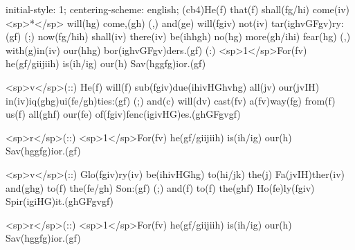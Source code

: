 initial-style: 1;
centering-scheme: english;
(cb4)He(f) that(f) shall(fg/hi) come(iv) <sp>*</sp> will(hg) come,(gh) (,) and(ge) will(fgiv) not(iv) tar(ighvGFgv)ry:(gf) (;) now(fg/hih) shall(iv) there(iv) be(ihhgh) no(hg) more(gh/ihi) fear(hg) (,) with(g)in(iv) our(hhg) bor(ighvGFgv)ders.(gf) (:) <sp>1</sp>For(fv) he(gf/giijiih) is(ih/ig) our(h) Sav(hggfg)ior.(gf) 

<sp>v</sp>(::) He(f) will(f) sub(fgiv)due(ihivHGhvhg) all(jv) our(jvIH) in(iv)iq(ghg)ui(fe/gh)ties:(gf) (;) and(c) will(dv) cast(fv) a(fv)way(fg) from(f) us(f) all(ghf) our(fe) of(fgiv)fenc(igivHG)es.(ghGFgvgf) 

<sp>r</sp>(::) <sp>1</sp>For(fv) he(gf/giijiih) is(ih/ig) our(h) Sav(hggfg)ior.(gf) 

<sp>v</sp>(::) Glo(fgiv)ry(iv) be(ihivHGhg) to(hi/jk) the(j) Fa(jvIH)ther(iv) and(ghg) to(f) the(fe/gh) Son:(gf) (;) and(f) to(f) the(ghf) Ho(fe)ly(fgiv) Spir(igiHG)it.(ghGFgvgf)

<sp>r</sp>(::) <sp>1</sp>For(fv) he(gf/giijiih) is(ih/ig) our(h) Sav(hggfg)ior.(gf) 